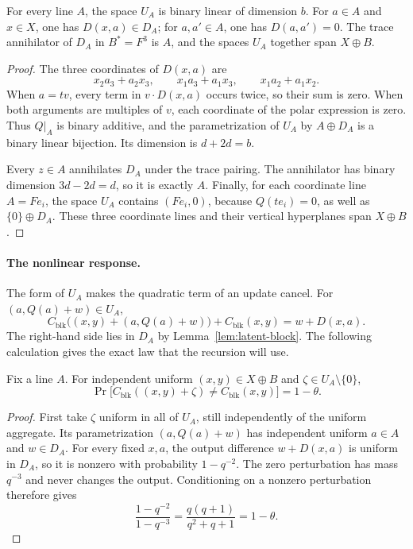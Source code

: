 \begin{lemma}\label{lem:latent-block}
For every line $A$, the space $U_A$ is binary linear of dimension $b$.
For $a\in A$ and $x\in X$, one has $D(x,a)\in D_A$; for $a,a'\in A$,
one has $D(a,a')=0$.  The trace annihilator of $D_A$ in $B^*=F^3$ is $A$,
and the spaces $U_A$ together span $X\oplus B$.
\end{lemma}

\begin{proof}
The three coordinates of $D(x,a)$ are
\[
 x_2a_3+a_2x_3,\qquad
 x_1a_3+a_1x_3,\qquad
 x_1a_2+a_1x_2.
\]
When $a=tv$, every term in $v\cdot D(x,a)$ occurs twice, so their sum is
zero.  When both arguments are multiples of $v$, each coordinate of the
polar expression is zero.  Thus $Q|_A$ is binary additive, and the
parametrization of $U_A$ by $A\oplus D_A$ is a binary linear bijection.
Its dimension is $d+2d=b$.

Every $z\in A$ annihilates $D_A$ under the trace pairing.  The annihilator
has binary dimension $3d-2d=d$, so it is exactly $A$.
Finally, for each coordinate line $A=Fe_i$, the space $U_A$ contains
$(Fe_i,0)$, because $Q(te_i)=0$, as well as $\{0\}\oplus D_A$.
These three coordinate lines and their vertical hyperplanes span
$X\oplus B$.
\end{proof}

\paragraph{The nonlinear response.}
The form of $U_A$ makes the quadratic term of an update cancel.  For
$(a,Q(a)+w)\in U_A$,
\[
 C_{\mathrm{blk}}\bigl((x,y)+(a,Q(a)+w)\bigr)
       +C_{\mathrm{blk}}(x,y)
 =w+D(x,a).
\]
The right-hand side lies in $D_A$ by Lemma~\ref{lem:latent-block}.
The following calculation gives the exact law that the recursion will use.

\begin{lemma}\label{lem:latent-block-noise}
Fix a line $A$.  For independent uniform $(x,y)\in X\oplus B$ and
$\zeta\in U_A\setminus\{0\}$,
\[
 \Pr\bigl[C_{\mathrm{blk}}((x,y)+\zeta)
             \ne C_{\mathrm{blk}}(x,y)\bigr]=1-\theta.
\]
\end{lemma}

\begin{proof}
First take $\zeta$ uniform in all of $U_A$, still independently of the
uniform aggregate.  Its parametrization
$(a,Q(a)+w)$ has independent uniform $a\in A$ and $w\in D_A$.
For every fixed $x,a$, the output difference $w+D(x,a)$ is uniform in
$D_A$, so it is nonzero with probability $1-q^{-2}$.  The zero
perturbation has mass $q^{-3}$ and never changes the output.  Conditioning
on a nonzero perturbation therefore gives
\[
 \frac{1-q^{-2}}{1-q^{-3}}
 =\frac{q(q+1)}{q^2+q+1}=1-\theta.
\]
\end{proof}

